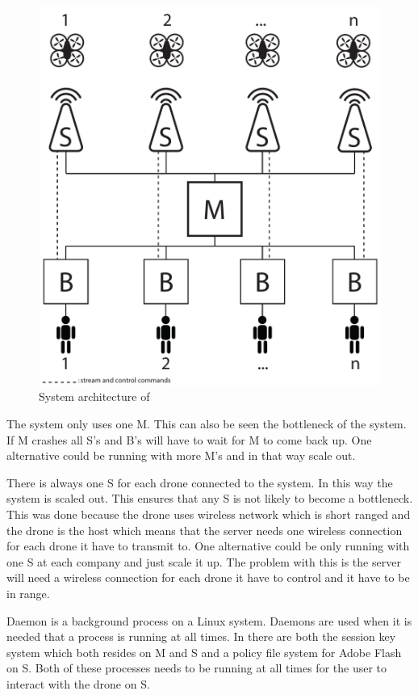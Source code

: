 \begin{figure}[htb]
    \centering 
    \includegraphics[width=\textwidth]{gfx/system_architecture.pdf}
    \caption{System architecture of \projectname{}}
    \label{fig:system_architecture}
\end{figure}

The system only uses one M. This can also be seen the bottleneck of the system.
If M crashes all S's and B's will have to wait for M to come back up.
One alternative could be running with more M's and in that way scale out.

There is always one S for each drone connected to the system.
In this way the system is scaled out.
This ensures that any S is not likely to become a bottleneck.
This was done because the drone uses wireless network which is short ranged and the drone is the host which means that the server needs one wireless connection for each drone it have to transmit to.
One alternative could be only running with one S at each company and just scale it up.
The problem with this is the server will need a wireless connection for each drone it have to control and it have to be in range.

Daemon is a background process on a Linux system.
Daemons are used when it is needed that a process is running at all times.
In \projectname{} there are both the session key system which both resides on M and S and a policy file system for Adobe Flash on S.
Both of these processes needs to be running at all times for the user to interact with the drone on S.